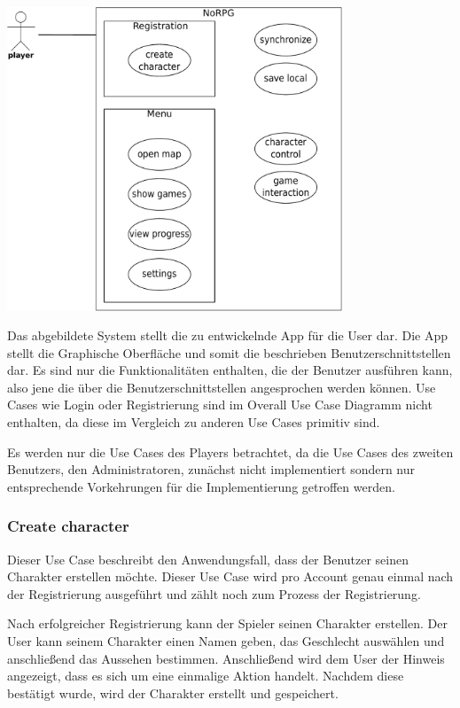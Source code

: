 		\begin{center}
			\includegraphics[width=10cm]{pics/OUCD.pdf}
		\end{center}
		
		Das abgebildete System stellt die zu entwickelnde App für die User dar. Die App stellt die Graphische Oberfläche und somit die beschrieben Benutzerschnittstellen dar. Es sind nur die Funktionalitäten enthalten, die der Benutzer ausführen kann, also jene die über die Benutzerschnittstellen angesprochen werden können. Use Cases wie Login oder Registrierung sind im Overall Use Case Diagramm nicht enthalten, da diese im Vergleich zu anderen Use Cases primitiv sind. 
		
		Es werden nur die Use Cases des Players betrachtet, da die Use Cases des zweiten Benutzers, den Administratoren, zunächst nicht implementiert sondern nur entsprechende Vorkehrungen für die Implementierung getroffen werden.
	
		\subsubsection{Create character}
			Dieser Use Case beschreibt den Anwendungsfall, dass der Benutzer seinen Charakter erstellen möchte. Dieser Use Case wird pro Account genau einmal nach der Registrierung ausgeführt und zählt noch zum Prozess der Registrierung.
			
			Nach erfolgreicher Registrierung kann der Spieler seinen Charakter erstellen. Der User kann seinem Charakter einen Namen geben, das Geschlecht auswählen und anschließend das Aussehen bestimmen. Anschließend wird dem User der Hinweis angezeigt, dass es sich um eine einmalige Aktion handelt. Nachdem diese bestätigt wurde, wird der Charakter erstellt und gespeichert.
				

